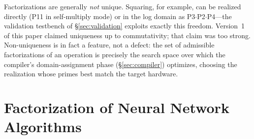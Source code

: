 \documentclass[11pt]{article}
\begin{document}
Factorizations are generally \textit{not} unique. Squaring, for example, can be realized directly (P11 in self-multiply mode) or in the log domain as P3$\cdot$P2$\cdot$P4---the validation testbench of \S\ref{sec:validation} exploits exactly this freedom. Version~1 of this paper claimed uniqueness up to commutativity; that claim was too strong. Non-uniqueness is in fact a feature, not a defect: the set of admissible factorizations of an operation is precisely the search space over which the compiler's domain-assignment phase (\S\ref{sec:compiler}) optimizes, choosing the realization whose primes best match the target hardware.

\section{Factorization of Neural Network Algorithms}
\label{sec:factorization}
\end{document}
